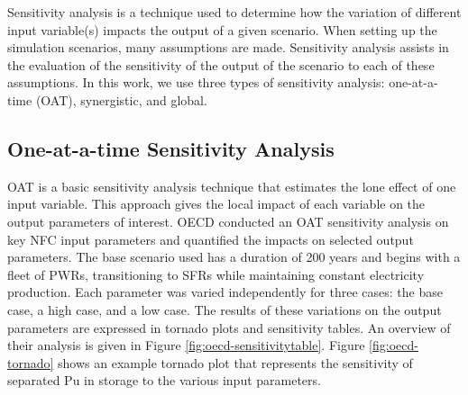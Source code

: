 Sensitivity analysis is a technique used to determine how the variation of 
different input variable(s) impacts the output of a given 
scenario. 
When setting up the simulation scenarios, many assumptions are made. 
Sensitivity analysis assists in the evaluation of the sensitivity of the 
output of the scenario to each of these assumptions. 
In this work, we use three types of sensitivity analysis: 
one-at-a-time (OAT), synergistic, and global.

\subsection{One-at-a-time Sensitivity Analysis}
OAT is a basic sensitivity analysis technique that estimates 
the lone effect of one input variable. 
This approach gives the local impact of each variable on the 
output parameters of interest. 
OECD conducted an OAT sensitivity analysis \cite{noauthor_effects_2017} 
on key \gls{NFC} input parameters
and quantified the impacts on selected output parameters. 
The base scenario used has a duration of 200 years and begins 
with a fleet of \glspl{PWR}, transitioning to \glspl{SFR} while 
maintaining constant electricity production. 
Each parameter was varied independently for three cases: 
the base case, a high case, and a low case. 
The results of these variations on the output parameters 
are expressed in tornado plots and sensitivity tables. 
An overview of their analysis is given in 
Figure \ref{fig:oecd-sensitivitytable}. 
Figure \ref{fig:oecd-tornado} shows an example tornado plot that represents 
the sensitivity of separated Pu in storage to the various input parameters. 


